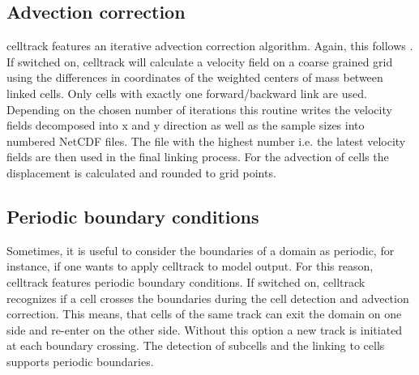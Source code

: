 \documentclass{scrartcl}
\begin{document}
\subsection{Advection correction}
celltrack features an iterative advection correction algorithm. Again, this follows \cite{moseley2013}. If switched on, celltrack will calculate a velocity field on a coarse grained grid using the differences in coordinates of the weighted centers of mass between linked cells. Only cells with exactly one forward/backward link are used. Depending on the chosen number of iterations this routine writes the velocity fields decomposed into x and y direction as well as the sample sizes into numbered NetCDF files. The file with the highest number i.e. the latest velocity fields are then used in the final linking process. For the advection of cells the displacement is calculated and rounded to grid points.

\subsection{Periodic boundary conditions}
Sometimes, it is useful to consider the boundaries of a domain as periodic, for instance, if one wants to apply celltrack to model output. For this reason, celltrack features periodic boundary conditions. If switched on, celltrack recognizes if a cell crosses the boundaries during the cell detection and advection correction. This means, that cells of the same track can exit the domain on one side and re-enter on the other side. Without this option a new track is initiated at each boundary crossing.
The detection of subcells and the linking to cells supports periodic boundaries.
\end{document}
